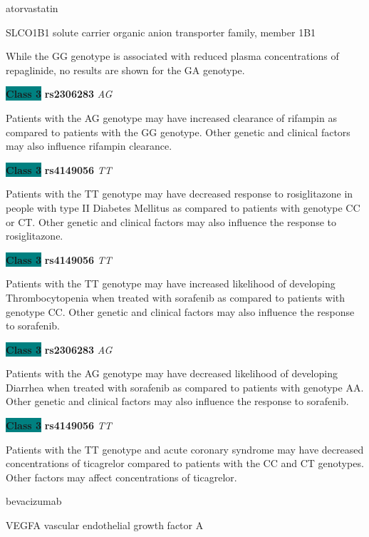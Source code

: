 \documentclass{resume} %
\begin{document}
\begin{rSection}{ atorvastatin }
\begin{rSubsection}{ SLCO1B1 }{ solute carrier organic anion transporter family, member 1B1 }{}{}
\item[] While the GG genotype is associated with reduced plasma concentrations of repaglinide, no results are shown for the GA genotype.\item \textbf{\colorbox{teal} {Class 3}} \textbf{ rs2306283 } \textit{ AG }
\item[] Patients with the AG genotype may have increased clearance of rifampin as compared to patients with the GG genotype. Other genetic and clinical factors may also influence rifampin clearance. \item \textbf{\colorbox{teal} {Class 3}} \textbf{ rs4149056 } \textit{ TT }
\item[] Patients with the TT genotype may have decreased response to rosiglitazone in people with type II Diabetes Mellitus as compared to patients with genotype CC or CT. Other genetic and clinical factors may also influence the response to rosiglitazone.\item \textbf{\colorbox{teal} {Class 3}} \textbf{ rs4149056 } \textit{ TT }
\item[] Patients with the TT genotype may have increased likelihood of developing Thrombocytopenia when treated with sorafenib as compared to patients with genotype CC. Other genetic and clinical factors may also influence the response to sorafenib.\item \textbf{\colorbox{teal} {Class 3}} \textbf{ rs2306283 } \textit{ AG }
\item[] Patients with the AG genotype may have decreased likelihood of developing Diarrhea when treated with sorafenib as compared to patients with genotype AA. Other genetic and clinical factors may also influence the response to sorafenib.\item \textbf{\colorbox{teal} {Class 3}} \textbf{ rs4149056 } \textit{ TT }
\item[] Patients with the TT genotype and acute coronary syndrome may have decreased concentrations of ticagrelor compared to patients with the CC and CT genotypes. Other factors may affect concentrations of ticagrelor.
\end{rSubsection}

\end{rSection}\begin{rSection}{ bevacizumab }
\item[]

\begin{rSubsection}{ VEGFA }{ vascular endothelial growth factor A }{}{}
\item[]


\end{rSubsection}
\end{rSection}
\end{document}
